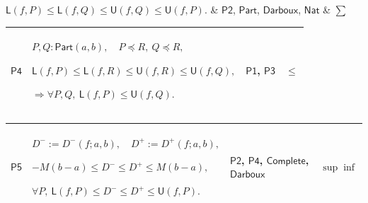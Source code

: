 \documentclass[11pt]{amsart}
\newlength{\FTCFourColumnBody}
\begin{document}
{\begin{tabular}
$\displaystyle \textsf{L}(f,P)\le\textsf{L}(f,Q)\le\textsf{U}(f,Q)\le\textsf{U}(f,P).$ & \hyperlink{proof:P2}{$\displaystyle \textsf{P2}$}, \hyperlink{def:Part}{$\displaystyle \textsf{Part}$}, \hyperlink{def:Darboux}{$\displaystyle \textsf{Darboux}$}, \hyperlink{ax:Nat}{$\displaystyle \textsf{Nat}$} & $\displaystyle \sum$\\ \hline
\end{tabular}%
\par\setlength{\parskip}{0pt}\nointerlineskip
\noindent
\begin{tabular}{|@{}>{\centering\arraybackslash}m{0.078431\FTCFourColumnBody}|>{\centering\arraybackslash}m{0.535947\FTCFourColumnBody}|>{\centering\arraybackslash}m{0.281045\FTCFourColumnBody}|>{\centering\arraybackslash}m{0.104575\FTCFourColumnBody}|}\hline
\hypertarget{proof:P4}{$\displaystyle \textsf{P4}$} & $\displaystyle P,Q:\textsf{Part}(a,b),\quad P\preceq R,\ Q\preceq R,$\par
$\displaystyle \textsf{L}(f,P)\le\textsf{L}(f,R)\le\textsf{U}(f,R)\le\textsf{U}(f,Q),$\par
$\displaystyle \Rightarrow\forall P,Q,\ \textsf{L}(f,P)\le\textsf{U}(f,Q).$ & \hyperlink{proof:P1}{$\displaystyle \textsf{P1}$}, \hyperlink{proof:P3}{$\displaystyle \textsf{P3}$} & $\displaystyle \le$\\ \hline
\end{tabular}%
\par\setlength{\parskip}{0pt}\nointerlineskip
\noindent
\begin{tabular}{|@{}>{\centering\arraybackslash}m{0.078431\FTCFourColumnBody}|>{\centering\arraybackslash}m{0.535947\FTCFourColumnBody}|>{\centering\arraybackslash}m{0.281045\FTCFourColumnBody}|>{\centering\arraybackslash}m{0.104575\FTCFourColumnBody}|}\hline
\hypertarget{proof:P5}{$\displaystyle \textsf{P5}$} & $\displaystyle D^-:=D^-(f;a,b),\quad D^+:=D^+(f;a,b),$\par
$\displaystyle -M(b-a)\le D^-\le D^+\le M(b-a),$\par
$\displaystyle \forall P,\ \textsf{L}(f,P)\le D^-\le D^+\le\textsf{U}(f,P).$ & \hyperlink{proof:P2}{$\displaystyle \textsf{P2}$}, \hyperlink{proof:P4}{$\displaystyle \textsf{P4}$}, \hyperlink{ax:Complete}{$\displaystyle \textsf{Complete}$}, \hyperlink{def:Darboux}{$\displaystyle \textsf{Darboux}$} & $\displaystyle \sup\inf$\\ \hline
\end{tabular}%
\par\setlength{\parskip}{0pt}\nointerlineskip
\noindent
\begin{tabular}{|@{}>{\centering\arraybackslash}m{0.078431\FTCFourColumnBody}|>{\centering\arraybackslash}m{0.535947\FTCFourColumnBody}|>{\centering\arraybackslash}m{0.281045\FTCFourColumnBody}|>{\centering\arraybackslash}m{0.104575\FTCFourColumnBody}|}\hline

\end{tabular}}
\end{document}
